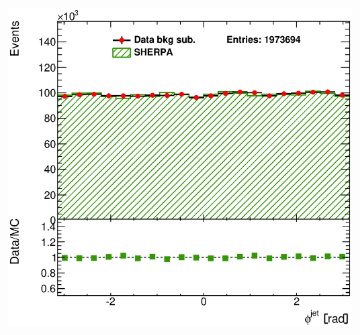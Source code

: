 \documentclass[12pt, twoside]{article}
\numberwithin{equation}{section}
\numberwithin{figure}{section}
\newenvironment{changemargin}[2]{%
\begin{list}{}{%
\setlength{\topsep}{0pt}%
\setlength{\leftmargin}{#1}%
\setlength{\rightmargin}{#2}%
\setlength{\listparindent}{\parindent}%
\setlength{\itemindent}{\parindent}%
\setlength{\parsep}{\parskip}%
}%
\item[]}{\end{list}}
\begin{document}
\begin{figure}
\begin{changemargin}{-1.0cm}{-0.75cm}
\begin{changemargin}{-0.75cm}{-1.0cm}
\begin{subfigure}[b]{0.37\textwidth}
            \subcaption{}
            \label{fig:BSRapidityJetSHERPA}
        \end{subfigure}
        \begin{subfigure}[b]{0.37\textwidth}
            \includegraphics[width=\textwidth]{./images/BackgroundSubtractedSherpa/SIG_EVENTS-106.eps}
            \subcaption{}
            \label{fig:BSPhiJetSHERPA}
        \end{subfigure}


\end{changemargin}
\end{changemargin}
\end{figure}
\end{document}
